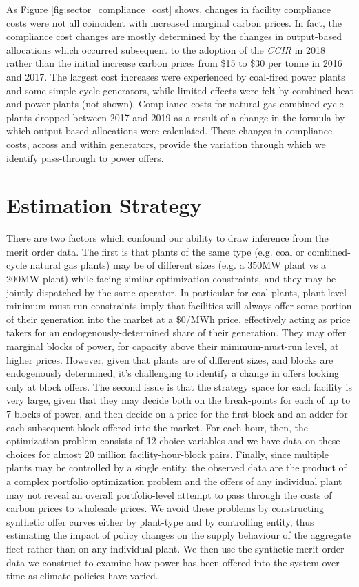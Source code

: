 \documentclass[12pt]{article}
\newcommand{\coe}{\text{CO$_2$e }}
\begin{document}
As Figure \ref{fig:sector_compliance_cost} shows, changes in facility compliance costs were not all coincident with increased marginal carbon prices. In fact, the compliance cost changes are mostly determined  by the changes in output-based allocations which occurred subsequent to the adoption of the \emph{CCIR} in 2018 rather than the initial increase carbon prices from \$15 to \$30 per tonne \coe in 2016 and 2017. The largest cost increases were experienced by coal-fired power plants and some simple-cycle generators, while limited effects were felt by combined heat and power plants (not shown). Compliance costs for natural gas combined-cycle plants dropped between 2017 and 2019 as a result of a change in the formula by which output-based allocations were calculated. These changes in compliance costs, across and within generators, provide the variation through which we identify pass-through to power offers.

\section{Estimation Strategy}
There are two factors which confound our ability to draw inference from the merit order data. The first is that plants of the same type (e.g. coal or combined-cycle natural gas plants) may be of different sizes (e.g. a 350MW plant vs a 200MW plant) while facing similar optimization constraints, and they may be jointly dispatched by the same operator. In particular for coal plants, plant-level minimum-must-run constraints imply that facilities will always offer some portion of their generation into the market at a \$0/MWh price, effectively acting as price takers for an endogenously-determined share of their generation. They may offer marginal blocks of power, for capacity above their minimum-must-run level, at higher prices. However, given that plants are of different sizes, and blocks are endogenously determined, it's challenging to identify a change in offers looking only at block offers. The second issue is that the strategy space for each facility is very large, given that they may decide both on the break-points for each of up to 7 blocks of power, and then decide on a price for the first block and an adder for each subsequent block offered into the market. For each hour, then, the optimization problem consists of 12 choice variables and we have data on these choices for almost 20 million facility-hour-block pairs. Finally, since multiple plants may be controlled by a single entity, the observed data are the product of a complex portfolio optimization problem and the offers of any individual plant may not reveal an overall portfolio-level attempt to pass through the costs of carbon prices to wholesale prices. We avoid these problems by constructing synthetic offer curves either by plant-type and by controlling entity, thus estimating the impact of policy changes on the supply behaviour of the aggregate fleet rather than on any individual plant. We then use the synthetic merit order data we construct to examine how power has been offered into the system over time as climate policies have varied.
\end{document}
